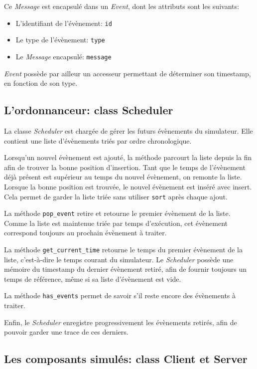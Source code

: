 \documentclass[11pt,a4paper]{article}
\begin{document}
Ce \emph{Message} est encapsulé dans un \emph{Event}, dont les attributs sont les suivants:
\begin{itemize}
    \item L'identifiant de l'évènement: \lstinline|id|
    \item Le type de l'évènement: \lstinline|type|
    \item Le \emph{Message} encapsulé: \lstinline|message|
\end{itemize}
\emph{Event} possède par ailleur un accesseur permettant de déterminer son timestamp, en fonction de son type.

\bigskip

\subsection{L'ordonnanceur: class Scheduler}

La classe \emph{Scheduler} est chargée de gérer les futurs évènements du simulateur. Elle contient une liste d'évènements triés par ordre chronologique.

Lorsqu'un nouvel évènement est ajouté, la méthode parcourt la liste depuis la fin afin de trouver la bonne position d'insertion. Tant que le temps de l'évènement déjà présent est supérieur au temps du nouvel évènement, on remonte la liste. Lorsque la bonne position est trouvée, le nouvel évènement est inséré avec insert. Cela permet de garder la liste triée sans utiliser \lstinline|sort| après chaque ajout.

La méthode \lstinline|pop_event| retire et retourne le premier évènement de la liste. Comme la liste est maintenue triée par temps d'exécution, cet évènement correspond toujours au prochain évènement à traiter.

La méthode \lstinline|get_current_time| retourne le temps du premier évènement de la liste, c'est-à-dire le temps courant du simulateur. Le \emph{Scheduler} possède une mémoire du timestamp du dernier évènement retiré, afin de fournir toujours un temps de référence, même si sa liste d'évènement est vide.

La méthode \lstinline|has_events| permet de savoir s'il reste encore des évènements à traiter.

Enfin, le \emph{Scheduler} enregistre progressivement les évènements retirés, afin de pouvoir garder une trace de ces derniers.

\bigskip

\subsection{Les composants simulés: class Client et Server}
\end{document}
